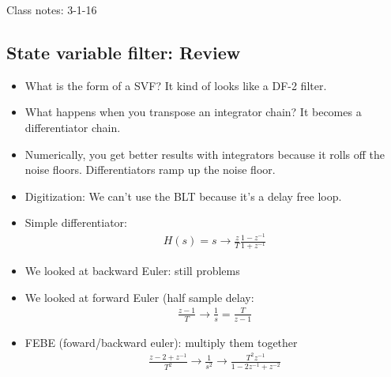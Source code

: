 Class notes: 3-1-16
\subsection*{State variable filter: Review}
\begin{itemize}
\item{What is the form of a SVF? It kind of looks like a DF-2 filter.}
\item{What happens when you transpose an integrator chain? It becomes a differentiator chain. }
\item{Numerically, you get better results with integrators because it rolls off the noise floors.
Differentiators ramp up the noise floor.
}
\item{Digitization: We can't use the BLT because it's a delay free loop.}
\item{Simple differentiator:
    \begin{align*}
    H(s) = s \rightarrow
    \frac{z}{T} \frac{1 - z^{-1}}{1 + z^{-1}}
    \end{align*}
}
\item{We looked at backward Euler: still problems}
\item{We looked at forward Euler (half sample delay:
    \begin{align*}
        \frac{z - 1 }{T} \rightarrow \frac{1}{s} = \frac{T}{z - 1}
    \end{align*}
}
\item{FEBE (foward/backward euler): multiply them together
    \begin{align*}
        \frac{z - 2 + z^{-1}}{T^2} 
        \rightarrow 
        \frac{1}{s^2} 
        \rightarrow 
        \frac{T^2 z^{-1}}{1 - 2z^{-1} + z^{-2}}
    \end{align*}
}
\end{itemize}

